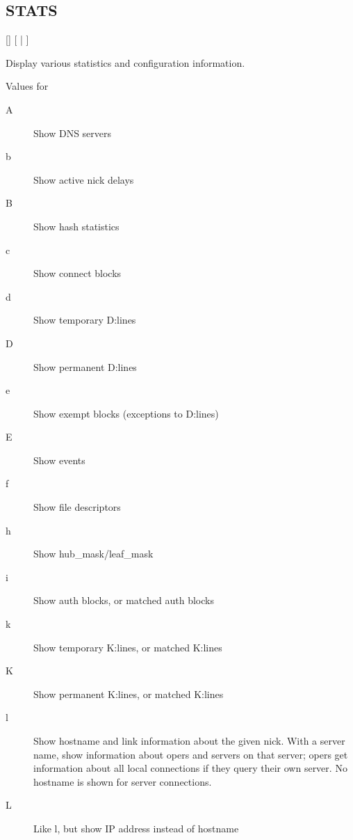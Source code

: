 \subsection{STATS}

 [] [ | ]

	Display various statistics and configuration information.


{\sc Values for }
\nopagebreak

\noindent
\begin{description}
\item[{A}]
	Show DNS servers

\item[{b}]
	Show active nick delays

\item[{B}]
	Show hash statistics

\item[{c}]
	Show connect blocks

\item[{d}]
	Show temporary D:lines

\item[{D}]
	Show permanent D:lines

\item[{e}]
	Show exempt blocks (exceptions to D:lines)

\item[{E}]
	Show events

\item[{f}]
	Show file descriptors

\item[{h}]
	Show hub\_mask/leaf\_mask

\item[{i}]
	Show auth blocks, or matched auth blocks

\item[{k}]
	Show temporary K:lines, or matched K:lines

\item[{K}]
	Show permanent K:lines, or matched K:lines

\item[{l}]
	Show hostname and link information about the given nick. With a server
	name, show information about opers and servers on that server; opers
	get information about all local connections if they query their own
	server. No hostname is shown for server connections.

\item[{L}]
	Like l, but show IP address instead of hostname


\end{description}
